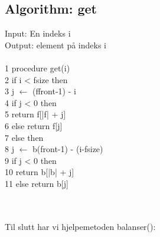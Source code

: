 \documentclass{article}%
\newcommand{\æ}{\textunderscore}
\newcommand{\å}{\iosevka}
\begin{document}
    \begin{minipage}[t]{.48\linewidth}
        \subsection*{Algorithm: get} 
        {\sbweight Input:} En indeks {\å i}\\
        {\sbweight Output:} element på indeks {\å i}\\\\
        \iosevka
        \color{darkgray}
        1 procedure get(i) \\
        2\hspace*{6mm} if i < f\æ size then\\
        3\hspace*{12mm} j $\leftarrow$ (f\æ front-1) - i\\
        4\hspace*{12mm} if j < 0 then\\
        5\hspace*{18mm} return f[|f| + j]\\
        6\hspace*{12mm} else return f[j]\\
        7\hspace*{6mm} else then\\
        8\hspace*{12mm} j $\leftarrow$ b\æ (front-1) - (i-f\æ size)\\
        9\hspace*{12mm} if j < 0 then\\
        10\hspace*{16mm} return b[|b| + j]\\
        11\hspace*{10mm} else return b[j]\\
    \end{minipage}\\\\
Til slutt har vi hjelpemetoden {\å balanser()}:\\
\end{document}
